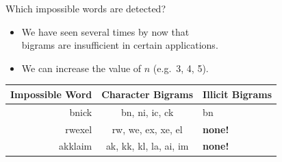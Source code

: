 \documentclass[professionalfonts, xcolor={usenames,svgnames,x11names,table}]{beamer}
\begin{document}
\begin{frame}{Which impossible words are detected?}
    \begin{itemize}
        \item We have seen several times by now that\\
              bigrams are insufficient in certain applications. 
        \item We can increase the value of $n$ (e.g.~3, 4, 5).
    \end{itemize}
    \begin{example}
        \centering
        \begin{tabular}{rcl}
            \textbf{Impossible Word} & \textbf{Character Bigrams} & \textbf{Illicit Bigrams}\\
            \hline
            bnick & bn, ni, ic, ck & bn\\
            rwexel & rw, we, ex, xe, el & \textbf{none!}\\
            akklaim & ak, kk, kl, la, ai, im & \textbf{none!}\\ 
        \end{tabular}
    \end{example}
\end{frame}
\end{document}
